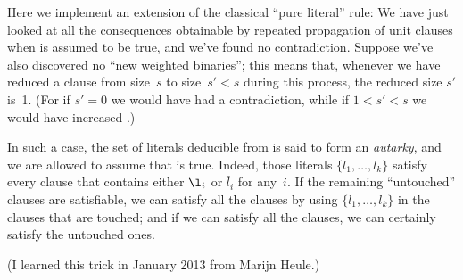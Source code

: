 Here we implement an extension of the classical ``pure literal'' rule:
We have just looked at all the consequences obtainable by repeated propagation
of unit clauses when  is assumed to be true, and we've
found no contradiction. Suppose we've also
discovered no ``new weighted binaries''; this means that, whenever
we have reduced a clause from size~$s$ to size~$s'<s$ during this process,
the reduced size $s'$ is~1. (For if $s'=0$ we would have had a contradiction,
while if $1<s'<s$ we would have increased .)

In such a case, the set of literals deducible from  is said to
form an {\it autarky}, and we are allowed to assume that  is
true. Indeed, those literals $\{l_1,\ldots,l_k\}$ satisfy every clause that
contains either $\l_i$ or $\bar l_i$ for any~$i$. If the remaining
``untouched'' clauses are satisfiable, we can satisfy all the clauses by using
$\{l_1,\ldots,l_k\}$ in the clauses that are touched; and if we can
satisfy all the clauses, we can certainly satisfy the untouched ones.

(I learned this trick in January 2013 from Marijn Heule.)

